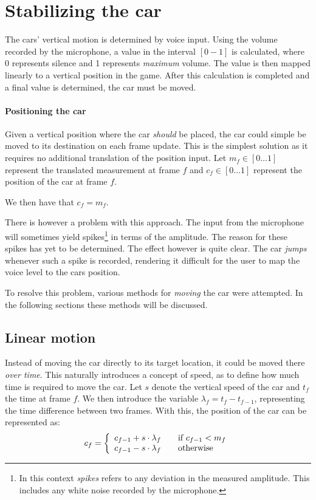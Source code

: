 \section{Stabilizing the car}\label{sprint3:stabil_car}
The cars' vertical motion is determined by voice input.
Using the volume recorded by the microphone, a value in the interval $[0-1]$ is calculated, where 0 represents silence and 1 represents \textit{maximum} volume.
The value is then mapped linearly to a vertical position in the game.
After this calculation is completed and a final value is determined, the car must be moved.

\paragraph{Positioning the car}
Given a vertical position where the car \textit{should} be placed, the car could simple be moved to its destination on each frame update.
This is the simplest solution as it requires no additional translation of the position input.
Let $m_f \in [0 \dots 1]$ represent the translated measurement at frame $f$ and $c_f \in [0 \dots 1]$ represent the position of the car at frame $f$.

\begin{center}
We then have that $c_f = m_f$.
\end{center}

There is however a problem with this approach.
The input from the microphone will sometimes yield spikes\footnote{
In this context \textit{spikes} refers to any deviation in the measured amplitude.
This includes any white noise recorded by the microphone.} in terms of the amplitude.
The reason for these spikes has yet to be determined.
The effect however is quite clear.
The car \textit{jumps} whenever such a spike is recorded, rendering it difficult for the user to map the voice level to the cars position.

To resolve this problem, various methods for \textit{moving} the car were attempted.
In the following sections these methods will be discussed.

\subsection{Linear motion}\label{stability:linear}
Instead of moving the car directly to its target location, it could be moved there \textit{over time}.
This naturally introduces a concept of speed, as to define how much time is required to move the car.
Let $s$ denote the vertical speed of the car and $t_f$ the time at frame $f$.
We then introduce the variable $\lambda_f = t_f - t_{f-1}$, representing the time difference between two frames.
With this, the position of the car can be represented as: $$c_f = \left\{ 
  \begin{array}{l l}
    c_{f-1} + s \cdot \lambda_f & \quad \text{if $c_{f-1} < m_f$}\\
    c_{f-1} - s \cdot \lambda_f & \quad \text{otherwise}
  \end{array} \right.$$

